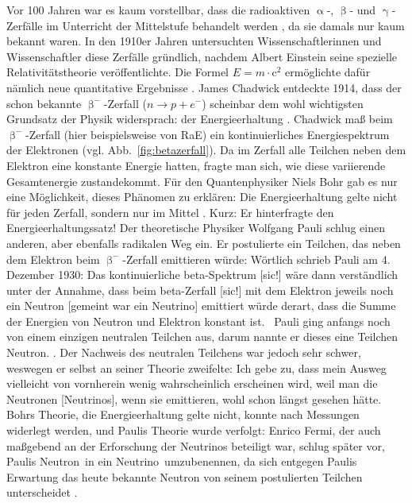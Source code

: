 \documentclass[a4paper,12pt]{article}
\newcommand{\figref}[1]{Abb.~\ref{#1}}
\begin{document}
Vor 100 Jahren war es kaum vorstellbar, dass die radioaktiven $\upalpha$-, $\upbeta$- und $\upgamma$-Zerfälle im Unterricht der Mittelstufe behandelt werden \cite{SSB}, da sie damals nur kaum bekannt waren. In den 1910er Jahren untersuchten Wissenschaftlerinnen und Wissenschaftler diese Zerfälle gründlich, nachdem Albert Einstein seine spezielle Relativitätstheorie veröffentlichte. Die Formel $E=m\cdot \mathrm{c}^2$ ermöglichte dafür nämlich neue quantitative Ergebnisse \cite[15]{Close2012}. James Chadwick entdeckte 1914, dass der schon bekannte $\upbeta^-$-Zerfall ($n \rightarrow p + e^-$) scheinbar dem
wohl wichtigsten Grundsatz der Physik widersprach: der Energieerhaltung \cite[4]{Ecker2020}. Chadwick maß beim $\upbeta^-$-Zerfall (hier beispielsweise von RaE) ein kontinuierliches Energiespektrum der Elektronen \cite[4]{Ecker2020} (vgl. \figref{fig:betazerfall}). Da im Zerfall alle Teilchen neben dem Elektron eine konstante Energie hatten, fragte man sich, wie diese variierende Gesamtenergie zustandekommt. Für den Quantenphysiker Niels Bohr gab es nur eine Möglichkeit, dieses Phänomen zu erklären: Die Energieerhaltung gelte nicht für jeden Zerfall, sondern nur im Mittel \cite[4]{Ecker2020}. Kurz: Er hinterfragte den Energieerhaltungssatz! Der theoretische Physiker Wolfgang Pauli schlug einen anderen, aber ebenfalls radikalen Weg ein. Er postulierte ein Teilchen, das neben dem Elektron beim $\upbeta^-$-Zerfall emittieren würde: Wörtlich schrieb Pauli am 4. Dezember 1930: \glqq Das kontinuierliche beta-Spektrum [sic!] wäre dann verständlich unter der Annahme, dass beim beta-Zerfall [sic!] mit dem Elektron jeweils noch ein Neutron [gemeint war ein Neutrino] emittiert würde derart, dass die Summe der Energien von Neutron und Elektron konstant ist.\grqq \ \cite[2]{Pauli} Pauli ging anfangs noch von einem einzigen neutralen Teilchen aus, darum nannte er dieses eine Teilchen Neutron. \cite[vgl.][2]{Pauli}.
Der Nachweis des neutralen Teilchens war jedoch sehr schwer, weswegen er selbst an seiner Theorie zweifelte: \glqq Ich gebe zu, dass mein Ausweg vielleicht von vornherein wenig wahrscheinlich erscheinen wird, weil man die Neutronen [Neutrinos], wenn sie emittieren, wohl schon längst gesehen hätte.\grqq \ \cite[2]{Pauli} Bohrs Theorie, die Energieerhaltung gelte nicht, konnte nach Messungen widerlegt werden, und Paulis Theorie wurde verfolgt: Enrico Fermi, der auch maßgebend an der Erforschung der Neutrinos beteiligt war, schlug später vor, Paulis \glqq Neutron\grqq \ in ein \glqq Neutrino\grqq \ umzubenennen, da sich entgegen Paulis Erwartung das heute bekannte Neutron von seinem postulierten Teilchen unterscheidet \cite{Fermi1934}. 
\end{document}
